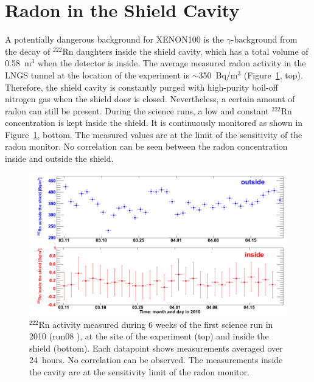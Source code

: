 \section{Radon in the Shield Cavity}

A potentially dangerous background for XENON100 is the $\gamma$-background from the
decay of ${^{222}}$Rn daughters inside the shield cavity, which has a total volume of 0.58~m$^3$ when the detector is inside.
The average measured radon activity in the LNGS tunnel at the location of the experiment is $\sim$350~Bq/m$^3$ (Figure~\ref{figRadonA}, top). 
Therefore, the shield cavity is constantly purged with high-purity boil-off nitrogen gas when the shield door is closed. Nevertheless, a certain amount of radon can still be present. During the science runs, a low and constant $^{222}$Rn concentration is kept inside the shield.  It is continuously monitored as shown in Figure~\ref{figRadonA}, bottom. The measured values are at the limit of the sensitivity of the radon monitor. No correlation can be seen between the radon concentration inside and outside the shield.

\begin{figure}[!h]
\centering
\includegraphics[width=0.9\linewidth]{plots//RnCavity/run08_spring_BoxAndCavity_CLR.png}
\caption[$^{222}$Rn activity measured during 6 weeks of the first science run at the site of the experiment and inside the shield]{$^{222}$Rn activity measured during 6 weeks of the first science run in 2010 (run08 \cite{xe100-run08}), at the site of the experiment (top) and inside the shield (bottom). Each datapoint shows measurements averaged over 24~hours. No correlation can be observed. The measurements inside the cavity are at the sensitivity limit of the radon monitor. }
\label{figRadonA}
\end{figure}


